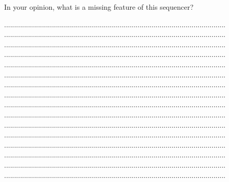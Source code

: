 \documentclass[12pt]{article}
\numberwithin{subsubsubsection}{subsubsection}
\begin{document}
\begin{enumerate}
In your opinion, what is a missing feature of this sequencer?

...............................................................................................................\\
...............................................................................................................\\
...............................................................................................................\\
...............................................................................................................\\
...............................................................................................................\\
...............................................................................................................\\
...............................................................................................................\\
...............................................................................................................\\
...............................................................................................................\\
...............................................................................................................\\
...............................................................................................................\\
...............................................................................................................\\
...............................................................................................................\\
...............................................................................................................\\
...............................................................................................................\\
...............................................................................................................\\
\end{enumerate}
\newpage
\end{document}
